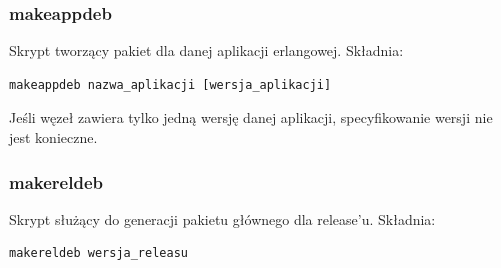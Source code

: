 \documentclass[polish,12pt]{aghthesis}
\begin{document}
\begin{itemize}
\subsubsection{makeappdeb}
Skrypt tworzący pakiet dla danej aplikacji erlangowej. Składnia:
\begin{lstlisting}
makeappdeb nazwa_aplikacji [wersja_aplikacji]
\end{lstlisting}
Jeśli węzeł zawiera tylko jedną wersję danej aplikacji, specyfikowanie wersji nie jest konieczne.
\subsubsection{makereldeb}
Skrypt służący do generacji pakietu głównego dla release'u. Składnia:
\begin{lstlisting}
makereldeb wersja_releasu
\end{lstlisting}

\end{itemize}
\end{document}
